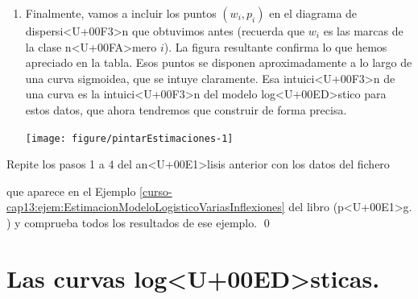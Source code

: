 \documentclass[10pt,a4paper]{article}
\begin{document}
\begin{enumerate}
\item Finalmente, vamos a incluir los puntos $(w_i, p_i)$ en el diagrama de dispersi<U+00F3>n que obtuvimos antes (recuerda que $w_i$ es las marcas de la clase n<U+00FA>mero $i$). La figura resultante confirma lo que hemos apreciado en la tabla. Esos puntos se disponen aproximadamente a lo largo de una curva sigmoidea, que se intuye claramente. Esa intuici<U+00F3>n de una curva es la intuici<U+00F3>n del modelo log<U+00ED>stico para estos datos, que ahora tendremos que construir de forma precisa.

\begin{knitrout}
\color{fgcolor}\begin{kframe}
\begin{alltt}
 \hlstd{=}\hlstd{,} \hlstd{=}\hlstd{,} \hlstd{=}\hlstd{)}
\end{alltt}
\end{kframe}

{\centering \texttt{[image: figure/pintarEstimaciones-1]} 

}



\end{knitrout}

\end{enumerate}


\begin{ejercicio}
\label{tut13:ejercicio03}
Repite los pasos 1 a 4 del an<U+00E1>lisis anterior con los datos del fichero
\begin{center}
\end{center}
que aparece en el Ejemplo \ref{curso-cap13:ejem:EstimacionModeloLogisticoVariasInflexiones} del libro (p<U+00E1>g. \pageref{curso-cap13:ejem:EstimacionModeloLogisticoVariasInflexiones}) y comprueba todos los resultados de ese ejemplo.
\qed
\end{ejercicio}


\section{Las curvas log<U+00ED>sticas.}
\label{tut13:subsec:CurvasLogisticas}
\end{document}
